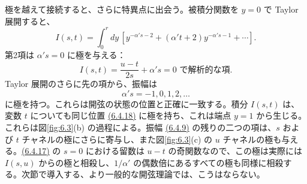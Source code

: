 極を越えて接続すると、さらに特異点に出会う。被積分関数を $y=0$ で Taylor 展開すると、
\begin{equation}
I(s,t)=\int_0^rdy\,\left[y^{-\alpha's-2}+(\alpha't+2)y^{-\alpha's-1}+\cdots\right].
\tag{6.4.16}\label{eq:6.4.16}
\end{equation}
第2項は $\alpha's=0$ に極を与える：
\begin{equation}
I(s,t)=\frac{u-t}{2s}+\text{$\alpha's=0$ で解析的な項}.
\tag{6.4.17}\label{eq:6.4.17}
\end{equation}
Taylor 展開のさらに先の項から、振幅は
\begin{equation}
\alpha's=-1,0,1,2,\ldots
\tag{6.4.18}\label{eq:6.4.18}
\end{equation}
に極を持つ。これらは開弦の状態の位置と正確に一致する。積分 $I(s,t)$ は、変数 $t$ についても同じ位置 \hyperref[eq:6.4.18]{(6.4.18)} に極を持ち、これは端点 $y=1$ から生じる。これらは図\ref{fig:6.3}(b) の過程による。振幅 \hyperref[eq:6.4.9]{(6.4.9)} の残りの二つの項は、$s$ および $t$ チャネルの極にさらに寄与し、また図\ref{fig:6.3}(c) の $u$ チャネルの極も与える。\hyperref[eq:6.4.17]{(6.4.17)} の $s=0$ における留数は $u-t$ の奇関数なので、この極は実際には $I(s,u)$ からの極と相殺し、$1/\alpha'$ の偶数倍にあるすべての極も同様に相殺する。次節で導入する、より一般的な開弦理論では、こうはならない。

